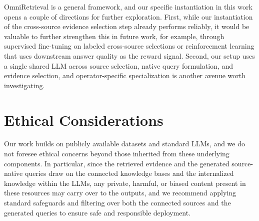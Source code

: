 \documentclass{llmxive}
\begin{document}
OmniRetrieval is a general framework, and our specific instantiation in this work opens a couple of directions for further exploration. First, while our instantiation of the cross-source evidence selection step already performs reliably, it would be valuable to further strengthen this in future work, for example, through supervised fine-tuning on labeled cross-source selections or reinforcement learning that uses downstream answer quality as the reward signal. Second, our setup uses a single shared LLM across source selection, native query formulation, and evidence selection, and operator-specific specialization is another avenue worth investigating.

\section*{Ethical Considerations}

Our work builds on publicly available datasets and standard LLMs, and we do not foresee ethical concerns beyond those inherited from these underlying components. In particular, since the retrieved evidence and the generated source-native queries draw on the connected knowledge bases and the internalized knowledge within the LLMs, any private, harmful, or biased content present in these resources may carry over to the outputs, and we recommend applying standard safeguards and filtering over both the connected sources and the generated queries to ensure safe and responsible deployment.




\end{document}
